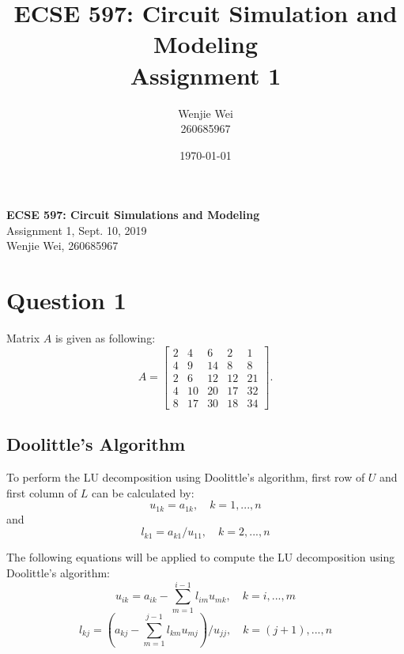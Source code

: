 \documentclass[a4paper,titlepage]{article}
\title{\textbf{ECSE 597: Circuit Simulation and Modeling} \\ Assignment 1}
\author{Wenjie Wei \\ 260685967}
\date{\today}
\begin{document}
	\sloppy	
	
	\begin{center}
		{\LARGE \bf ECSE 597: Circuit Simulations and Modeling}\\
		{\large Assignment 1, Sept. 10, 2019}\\
		{Wenjie Wei, 260685967}
	\end{center}
	
	\section{Question 1}
		Matrix $A$ is given as following:
		$$
			A = \begin{bmatrix}
				2 & 4 & 6 & 2 & 1\\
				4 & 9 & 14 & 8 & 8\\
				2 & 6 & 12 & 12 & 21\\
				4 & 10 & 20 & 17 & 32\\
				8 & 17 & 30 & 18 & 34
			\end{bmatrix}.
		$$
	
	\subsection{Doolittle's Algorithm}		
		To perform the LU decomposition using Doolittle's algorithm, first row of $U$ and first column of $L$ can be calculated by:
		\begin{equation}
			u_{1k} = a_{1k}, \quad k = 1, ..., n
			\label{1st_row}
		\end{equation}		
		and
		\begin{equation}
			l_{k1} = a_{k1} / u_{11}, \quad k = 2,...,n
			\label{1st_col}
		\end{equation}
		
		The following equations will be applied to compute the LU decomposition using Doolittle's algorithm:
		\begin{equation}
			u_{ik} = a_{ik} - \sum_{m=1}^{i-1} l_{im}u_{mk}, \quad k = i, ..., m
			\label{rows}
		\end{equation}
		\begin{equation}
			l_{kj} = (a_{kj} - \sum_{m=1}^{j-1} l_{km}u_{mj}) / u_{jj}, \quad k = (j+1), ..., n
			\label{cols}
		\end{equation}
		
\end{document}
